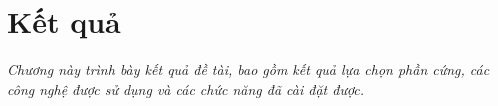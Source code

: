 \chapter{Kết quả}
\label{Chapter4}

\emph{Chương này trình bày kết quả đề tài, bao gồm kết quả lựa chọn phần cứng, các công nghệ được sử dụng và các chức năng đã cài đặt được.}